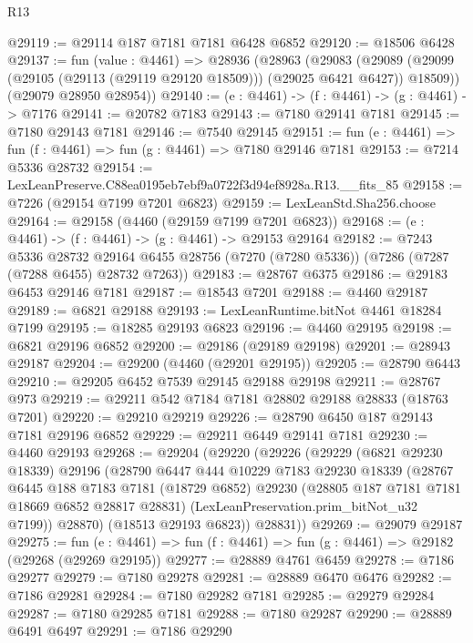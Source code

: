 \begin{lexlean}{R13}
\begin{coremodule}
@29119 := @29114 @187 @7181 @7181 @6428 @6852
@29120 := @18506 @6428
@29137 := fun (value : @4461) =>
  @28936
    (@28963
      (@29083
        (@29089 (@29099 (@29105 (@29113 (@29119 @29120 @18509))) (@29025 @6421 @6427)) @18509))
      (@29079 @28950 @28954))
@29140 := (e : @4461) -> (f : @4461) -> (g : @4461) -> @7176
@29141 := @20782 @7183
@29143 := @7180 @29141 @7181
@29145 := @7180 @29143 @7181
@29146 := @7540 @29145
@29151 := fun (e : @4461) => fun (f : @4461) => fun (g : @4461) => @7180 @29146 @7181
@29153 := @7214 @5336 @28732
@29154 := LexLeanPreserve.C88ea0195eb7ebf9a0722f3d94ef8928a.R13.__fits_85
@29158 := @7226 (@29154 @7199 @7201 @6823)
@29159 := LexLeanStd.Sha256.choose
@29164 := @29158 (@4460 (@29159 @7199 @7201 @6823))
@29168 := (e : @4461) -> (f : @4461) -> (g : @4461) -> @29153 @29164
@29182 := @7243
    @5336
    @28732
    @29164
    @6455
    @28756
    (@7270 (@7280 @5336))
    (@7286 (@7287 (@7288 @6455) @28732 @7263))
@29183 := @28767 @6375
@29186 := @29183 @6453 @29146 @7181
@29187 := @18543 @7201
@29188 := @4460 @29187
@29189 := @6821 @29188
@29193 := LexLeanRuntime.bitNot @4461 @18284 @7199
@29195 := @18285 @29193 @6823
@29196 := @4460 @29195
@29198 := @6821 @29196 @6852
@29200 := @29186 (@29189 @29198)
@29201 := @28943 @29187
@29204 := @29200 (@4460 (@29201 @29195))
@29205 := @28790 @6443
@29210 := @29205 @6452 @7539 @29145 @29188 @29198
@29211 := @28767 @973
@29219 := @29211 @542 @7184 @7181 @28802 @29188 @28833 (@18763 @7201)
@29220 := @29210 @29219
@29226 := @28790 @6450 @187 @29143 @7181 @29196 @6852
@29229 := @29211 @6449 @29141 @7181
@29230 := @4460 @29193
@29268 := @29204
    (@29220
      (@29226
        (@29229
          (@6821 @29230 @18339)
          @29196
          (@28790
            @6447
            @444
            @10229
            @7183
            @29230
            @18339
            (@28767
              @6445
              @188
              @7183
              @7181
              (@18729 @6852)
              @29230
              (@28805 @187 @7181 @7181 @18669 @6852 @28817 @28831)
              (LexLeanPreservation.prim_bitNot_u32 @7199))
            @28870)
          (@18513 @29193 @6823))
        @28831))
@29269 := @29079 @29187
@29275 := fun (e : @4461) => fun (f : @4461) => fun (g : @4461) => @29182 (@29268 (@29269 @29195))
@29277 := @28889 @4761 @6459
@29278 := @7186 @29277
@29279 := @7180 @29278
@29281 := @28889 @6470 @6476
@29282 := @7186 @29281
@29284 := @7180 @29282 @7181
@29285 := @29279 @29284
@29287 := @7180 @29285 @7181
@29288 := @7180 @29287
@29290 := @28889 @6491 @6497
@29291 := @7186 @29290

\end{coremodule}
\end{lexlean}
